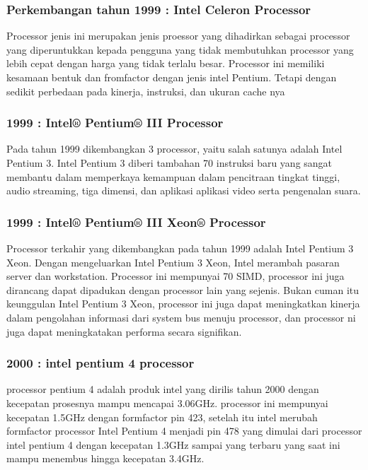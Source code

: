  			\subsubsection{Perkembangan tahun 1999 : Intel Celeron Processor}
 	Processor jenis ini merupakan jenis proessor yang dihadirkan sebagai processor yang diperuntukkan kepada pengguna yang tidak membutuhkan processor yang lebih cepat dengan harga yang tidak terlalu besar. Processor ini memiliki kesamaan bentuk dan fromfactor dengan jenis intel Pentium. Tetapi dengan sedikit perbedaan pada kinerja, instruksi, dan ukuran cache nya


 			\subsubsection{1999 : Intel® Pentium® III Processor}
 	Pada tahun 1999 dikembangkan 3 processor, yaitu salah satunya adalah Intel Pentium 3. Intel Pentium 3 diberi tambahan 70 instruksi baru yang sangat membantu dalam memperkaya kemampuan dalam pencitraan tingkat tinggi, audio streaming, tiga dimensi, dan aplikasi aplikasi video serta pengenalan suara. 
 			\subsubsection{1999 : Intel® Pentium® III Xeon® Processor}
 	Processor terkahir yang dikembangkan pada tahun 1999 adalah Intel Pentium 3 Xeon. Dengan mengeluarkan Intel Pentium 3 Xeon, Intel merambah pasaran server dan workstation. Processor ini mempunyai 70 SIMD, processor ini juga dirancang dapat dipadukan dengan processor lain yang sejenis. Bukan cuman itu keunggulan Intel Pentium 3 Xeon, processor ini juga dapat meningkatkan kinerja dalam pengolahan informasi dari system bus menuju processor, dan processor ni juga dapat meningkatakan performa secara signifikan.


			\subsubsection{2000 : intel pentium 4 processor}
 	processor pentium 4 adalah produk intel yang dirilis tahun 2000 dengan kecepatan prosesnya mampu mencapai 3.06GHz. processor ini mempunyai kecepatan 1.5GHz dengan formfactor pin 423, setelah itu intel merubah formfactor processor Intel Pentium 4 menjadi pin 478 yang dimulai dari processor intel pentium 4 dengan kecepatan 1.3GHz sampai yang terbaru yang saat ini mampu menembus hingga kecepatan 3.4GHz.


